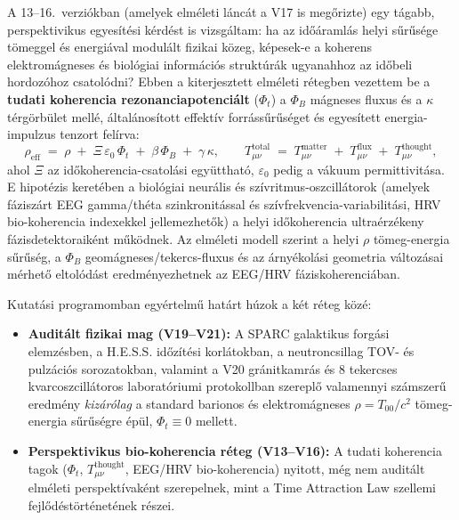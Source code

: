 \documentclass[10pt,a4paper]{article}
\begin{document}
\par
A 13--16.\ verzi\'okban (amelyek elm\'eleti l\'anc\'at a V17 is meg\H{o}rizte) egy t\'agabb, perspektivikus egyes\'it\'esi k\'erd\'est is vizsg\'altam: ha az id\H{o}\'araml\'as helyi s\H{u}r\H{u}s\'ege t\"omeggel \'es energi\'aval modul\'alt fizikai k\"ozeg, k\'epesek-e a koherens elektrom\'agneses \'es biol\'ogiai inform\'aci\'os strukt\'ur\'ak ugyanahhoz az id\H{o}beli hordoz\'ohoz csatol\'odni? Ebben a kiterjesztett elm\'eleti r\'etegben vezettem be a \textbf{tudati koherencia rezonanciapotenci\'alt} ($\Phi_t$) a $\Phi_B$ m\'agneses fluxus \'es a $\kappa$ t\'erg\"orb\"ulet mell\'e, \'altal\'anos\'itott effekt\'iv forr\'ass\H{u}r\H{u}s\'eget \'es egyes\'itett energia-impulzus tenzort fel\'irva:
\begin{equation}
  \rho_{\text{eff}} \;=\; \rho \;+\; \Xi\,\varepsilon_0\,\Phi_t \;+\; \beta\,\Phi_B \;+\; \gamma\,\kappa, \qquad
  T_{\mu\nu}^{\text{total}} \;=\; T_{\mu\nu}^{\text{matter}} \;+\; T_{\mu\nu}^{\text{flux}} \;+\; T_{\mu\nu}^{\text{thought}},
\end{equation}
ahol $\Xi$ az id\H{o}koherencia-csatol\'asi egy\"utthat\'o, $\varepsilon_0$ pedig a v\'akuum permittivit\'asa. E hipot\'ezis keret\'eben a biol\'ogiai neur\'alis \'es sz\'ivritmus-oszcill\'atorok (amelyek f\'azisz\'art EEG gamma/th\'eta szinkronit\'assal \'es sz\'ivfrekvencia-variabilit\'asi, HRV bio-koherencia indexekkel jellemezhet\H{o}k) a helyi id\H{o}koherencia ultra\'erz\'ekeny f\'azisdetektoraik\'ent m\H{u}k\"odnek. Az elm\'eleti modell szerint a helyi $\rho$ t\"omeg-energia s\H{u}r\H{u}s\'eg, a $\Phi_B$ geom\'agneses/tekercs-fluxus \'es az \'arny\'ekol\'asi geometria v\'altoz\'asai m\'erhet\H{o} eltol\'od\'ast eredm\'enyezhetnek az EEG/HRV f\'aziskoherenci\'aban.

\par
Kutat\'asi programomban egy\'ertelm\H{u} hat\'art h\'uzok a k\'et r\'eteg k\"oz\'e:
\begin{itemize}\setlength{\itemsep}{1.5pt}\setlength{\parskip}{0pt}\setlength{\topsep}{1pt}
  \item \textbf{Audit\'alt fizikai mag (V19--V21):} A SPARC galaktikus forg\'asi elemz\'esben, a H.E.S.S. id\H{o}z\'it\'esi korl\'atokban, a neutroncsillag TOV- \'es pulz\'aci\'os sorozatokban, valamint a V20 gr\'anitkamr\'as \'es 8 tekercses kvarcoszcill\'atoros laborat\'oriumi protokollban szerepl\H{o} valamennyi sz\'amszer\H{u} eredm\'eny \emph{kiz\'ar\'olag} a standard barionos \'es elektrom\'agneses $\rho = T_{00}/c^2$ t\"omeg-energia s\H{u}r\H{u}s\'egre \'ep\"ul, $\Phi_t \equiv 0$ mellett.
  \item \textbf{Perspektivikus bio-koherencia r\'eteg (V13--V16):} A tudati koherencia tagok ($\Phi_t$, $T_{\mu\nu}^{\text{thought}}$, EEG/HRV bio-koherencia) nyitott, m\'eg nem audit\'alt elm\'eleti perspekt\'ivak\'ent szerepelnek, mint a Time Attraction Law szellemi fejl\H{o}d\'est\"ort\'enet\'enek r\'eszei.
\end{itemize}
\newpage
\end{document}

